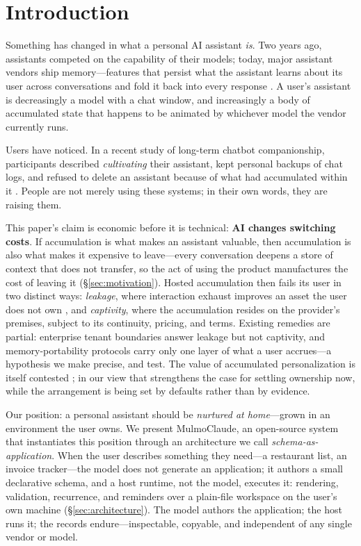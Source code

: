 \documentclass[11pt]{article}
\begin{document}
\section{Introduction}
\label{sec:intro}

Something has changed in what a personal AI assistant \emph{is}. Two years ago,
assistants competed on the capability of their models; today, major assistant
vendors ship memory---features that persist what the assistant learns about its user
across conversations and fold it back into every response
\citep{memgpt,mem0,memorybank}. A user's assistant is decreasingly a model with a
chat window, and increasingly a body of accumulated state that happens to be
animated by whichever model the vendor currently runs.

Users have noticed. In a recent study of long-term chatbot companionship,
participants described \emph{cultivating} their assistant, kept personal backups
of chat logs, and refused to delete an assistant because of what had accumulated
within it \citep{digital-companionship}. People are not merely using these
systems; in their own words, they are raising them.

This paper's claim is economic before it is technical: \textbf{AI changes
switching costs}. If accumulation is what makes an assistant valuable, then
accumulation is also what makes it expensive to leave---every conversation
deepens a store of context that does not transfer, so the act of using the
product manufactures the cost of leaving it (\S\ref{sec:motivation}). Hosted
accumulation then fails its user in two distinct ways: \emph{leakage}, where
interaction exhaust improves an asset the user does not own \citep{nadella-rip},
and \emph{captivity}, where the accumulation resides on the provider's premises,
subject to its continuity, pricing, and terms. Existing remedies are partial:
enterprise tenant boundaries answer leakage but not captivity, and
memory-portability protocols \citep{portable-agent-memory,samep} carry only one
layer of what a user accrues---a hypothesis we make precise, and test. The value
of accumulated personalization is itself contested \citep{recentering-humans};
in our view that strengthens the case for settling ownership now, while the
arrangement is being set by defaults rather than by evidence.

Our position: a personal assistant should be \emph{nurtured at home}---grown in
an environment the user owns. We present MulmoClaude, an open-source system that
instantiates this position through an architecture we call
\emph{schema-as-application}. When the user describes something they need---a
restaurant list, an invoice tracker---the model does not generate an application;
it authors a small declarative schema, and a host runtime, not the model,
executes it: rendering, validation, recurrence, and reminders over a plain-file
workspace on the user's own machine (\S\ref{sec:architecture}). The model authors
the application; the host runs it; the records endure---inspectable, copyable,
and independent of any single vendor or model.
\end{document}
